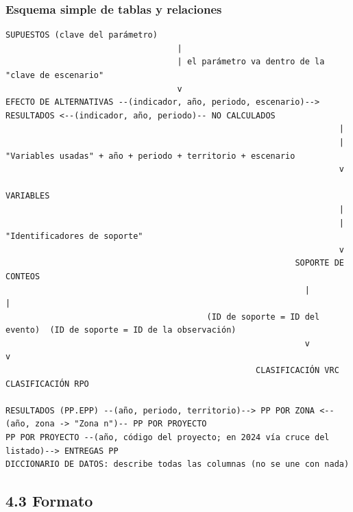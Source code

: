 \documentclass[11pt,letterpaper]{article}
\newcommand{\pagsize}{\special{papersize=21.59cm,27.94cm}}
\begin{document}
\subsubsection*{Esquema simple de tablas y relaciones}

\begin{Verbatim}[fontsize=\footnotesize,frame=single,rulecolor=\color{gray},framesep=2mm]
                         SUPUESTOS (clave del parámetro)
                                   |
                                   | el parámetro va dentro de la "clave de escenario"
                                   v
EFECTO DE ALTERNATIVAS --(indicador, año, periodo, escenario)--> RESULTADOS <--(indicador, año, periodo)-- NO CALCULADOS
                                                                    |
                                                                    | "Variables usadas" + año + periodo + territorio + escenario
                                                                    v
                                                                VARIABLES
                                                                    |
                                                                    | "Identificadores de soporte"
                                                                    v
                                                           SOPORTE DE CONTEOS
                                                             |            |
                                         (ID de soporte = ID del evento)  (ID de soporte = ID de la observación)
                                                             v            v
                                                   CLASIFICACIÓN VRC   CLASIFICACIÓN RPO

RESULTADOS (PP.EPP) --(año, periodo, territorio)--> PP POR ZONA <--(año, zona -> "Zona n")-- PP POR PROYECTO
PP POR PROYECTO --(año, código del proyecto; en 2024 vía cruce del listado)--> ENTREGAS PP
DICCIONARIO DE DATOS: describe todas las columnas (no se une con nada)
\end{Verbatim}

\clearpage
\restoregeometry
\setlength{\headwidth}{\textwidth}
\renewcommand{\pagsize}{\special{papersize=21.59cm,27.94cm}}

\subsection*{4.3 Formato}

\end{document}
